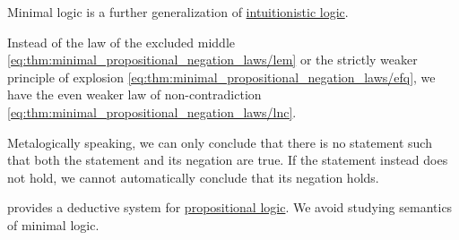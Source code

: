 \begin{remark}\label{rem:minimal_logic}
  Minimal logic is a further generalization of \hyperref[rem:intuitionistic_logic]{intuitionistic logic}.

  Instead of the law of the excluded middle \eqref{eq:thm:minimal_propositional_negation_laws/lem} or the strictly weaker principle of explosion \eqref{eq:thm:minimal_propositional_negation_laws/efq}, we have the even weaker law of non-contradiction \eqref{eq:thm:minimal_propositional_negation_laws/lnc}.

  Metalogically speaking, we can only conclude that there is no statement such that both the statement and its negation are true. If the statement instead does not hold, we cannot automatically conclude that its negation holds.

   provides a deductive system for \hyperref[subsec:propositional_logic]{propositional logic}. We avoid studying semantics of minimal logic.
\end{remark}

